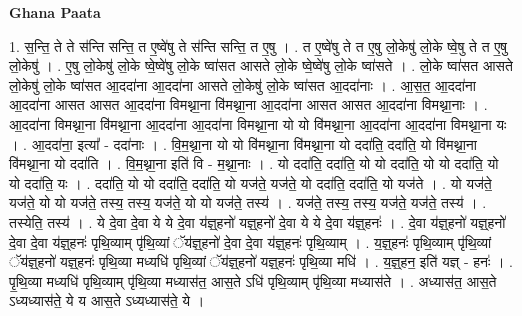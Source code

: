 \documentclass[17pt]{extarticle}
\begin{document}
\textbf{Ghana Paata } \newline

1. स॒न्ति॒ ते ते स॑न्ति सन्ति॒ त ए॒ष्वे॑षु ते स॑न्ति सन्ति॒ त ए॒षु । . त ए॒ष्वे॑षु ते त ए॒षु लो॒केषु॑ लो॒के ष्वे॒षु ते त ए॒षु लो॒केषु॑ । . ए॒षु लो॒केषु॑ लो॒के ष्वे॒ष्वे॑षु लो॒के ष्वा॑सत आसते लो॒के ष्वे॒ष्वे॑षु लो॒के ष्वा॑सते । . लो॒के ष्वा॑सत आसते लो॒केषु॑ लो॒के ष्वा॑सत आ॒ददा॑ना आ॒ददा॑ना आसते लो॒केषु॑ लो॒के ष्वा॑सत आ॒ददा॑नाः । . आ॒स॒त॒ आ॒ददा॑ना आ॒ददा॑ना आसत आसत आ॒ददा॑ना विमथ्ना॒ना वि॑मथ्ना॒ना आ॒ददा॑ना आसत आसत आ॒ददा॑ना विमथ्ना॒नाः । . आ॒ददा॑ना विमथ्ना॒ना वि॑मथ्ना॒ना आ॒ददा॑ना आ॒ददा॑ना विमथ्ना॒ना यो यो वि॑मथ्ना॒ना आ॒ददा॑ना आ॒ददा॑ना विमथ्ना॒ना यः । . आ॒ददा॑ना॒ इत्या᳚ - ददा॑नाः । . वि॒म॒थ्ना॒ना यो यो वि॑मथ्ना॒ना वि॑मथ्ना॒ना यो ददा॑ति॒ ददा॑ति॒ यो वि॑मथ्ना॒ना वि॑मथ्ना॒ना यो ददा॑ति । . वि॒म॒थ्ना॒ना इति॑ वि - म॒थ्ना॒नाः । . यो ददा॑ति॒ ददा॑ति॒ यो यो ददा॑ति॒ यो यो ददा॑ति॒ यो यो ददा॑ति॒ यः । . ददा॑ति॒ यो यो ददा॑ति॒ ददा॑ति॒ यो यज॑ते॒ यज॑ते॒ यो ददा॑ति॒ ददा॑ति॒ यो यज॑ते । . यो यज॑ते॒ यज॑ते॒ यो यो यज॑ते॒ तस्य॒ तस्य॒ यज॑ते॒ यो यो यज॑ते॒ तस्य॑ । . यज॑ते॒ तस्य॒ तस्य॒ यज॑ते॒ यज॑ते॒ तस्य॑ । . तस्येति॒ तस्य॑ । . ये दे॒वा दे॒वा ये ये दे॒वा य॑ज्ञ्॒हनो॑ यज्ञ्॒हनो॑ दे॒वा ये ये दे॒वा य॑ज्ञ्॒हनः॑ । . दे॒वा य॑ज्ञ्॒हनो॑ यज्ञ्॒हनो॑ दे॒वा दे॒वा य॑ज्ञ्॒हनः॑ पृथि॒व्याम् पृ॑थि॒व्यां ॅय॑ज्ञ्॒हनो॑ दे॒वा दे॒वा य॑ज्ञ्॒हनः॑ पृथि॒व्याम् । . य॒ज्ञ्॒हनः॑ पृथि॒व्याम् पृ॑थि॒व्यां ॅय॑ज्ञ्॒हनो॑ यज्ञ्॒हनः॑ पृथि॒व्या मध्यधि॑ पृथि॒व्यां ॅय॑ज्ञ्॒हनो॑ यज्ञ्॒हनः॑ पृथि॒व्या मधि॑ । . य॒ज्ञ्॒हन॒ इति॑ यज्ञ् - हनः॑ । . पृ॒थि॒व्या मध्यधि॑ पृथि॒व्याम् पृ॑थि॒व्या मध्यास॑त॒ आस॒ते ऽधि॑ पृथि॒व्याम् पृ॑थि॒व्या मध्यास॑ते । . अध्यास॑त॒ आस॒ते ऽध्यध्यास॑ते॒ ये य आस॒ते ऽध्यध्यास॑ते॒ ये । \newline
\end{document}

